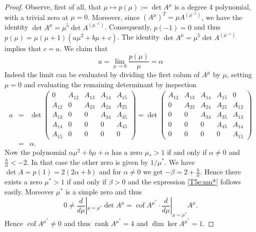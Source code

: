 \documentclass[titlepage]{amsart}
\numberwithin{equation}{section}
\theoremstyle{plain}
\theoremstyle{definition}
\theoremstyle{remark}
\newcommand{\cof}{\operatorname{cof}}
\newcommand{\rank}{\operatorname{rank}}
\begin{document}
\begin{proof}
Observe, first of all, that $\mu\mapsto p(\mu):=\det A^{\mu}$ is a degree 4 polynomial, with a trivial zero at $\mu=0$. Moreover, since $(A^\mu)^T=\mu A^{(\mu^{-1})}$, we have the identity $\det A^\mu=\mu^5\det A^{(\mu^{-1})}$. Consequently, $p(-1) = 0$ and thus
$p(\mu) = \mu (\mu+1) (a \mu^2 + b \mu + c)$. The identity $\det A^\mu=\mu^5\det A^{(\mu^{-1})}$ implies that $c=a$.
We claim that 
$$ a = \lim_{\mu \to 0} \frac{p(\mu)}{\mu} = \alpha$$
Indeed the limit can be evaluated by dividing the first colum of $A^\mu$ by $\mu$, setting $\mu = 0$ and evaluating the remaining determinant by 
inspection
\begin{eqnarray*}
a &=& \det\begin{pmatrix} 0& A_{12}& A_{13}& A_{14}& A_{15}\\ A_{12}&0& A_{23}& A_{24}& A_{25}\\
A_{13}&0&0& A_{34}& A_{35}\\ A_{14}&0&0&0& A_{45}\\ A_{15}&0&0&0&0\end{pmatrix}=
\det\begin{pmatrix}  A_{12}& A_{13}& A_{14}& A_{15}&0\\0& A_{23}& A_{24}& A_{25}& A_{12}\\
0&0&A_{34}& A_{35}& A_{13}\\0&0&0& A_{45}& A_{14}\\0&0&0&0& A_{15}\end{pmatrix}  \\ 
&=&  \alpha.
\end{eqnarray*}
Now  the polynomial $\alpha \mu^2 + b \mu + \alpha$  has a zero $\mu_* > 1$ if and only if $\alpha \ne 0$ and $\frac{b}{\alpha} < -2$. 
In that case the other zero is given by $1/{\mu^*}$.
We have  $\det A = p(1) = 2 (2\alpha + b)$ and for $\alpha \ne 0$ we get   $-\beta = 2 + \frac{b}{\alpha}$.   
Hence there exists a zero $\mu^* >1$ if and only if $\beta > 0$ and the expression  \eqref{T5e:mu*} follows easily. 
Moreover $\mu^*$ is a simple zero and thus 
$$ 0 \ne \frac{d}{d\mu}|_{\mu= \mu^*} \det A^\mu = \cof A^{\mu^*} \cdot  \frac{d}{d\mu}|_{\mu= \mu^*} A^\mu.$$ 
Hence $\cof A^{\mu^*} \ne 0$ and
 thus $\rank A^{\mu^*}=4$ 
 and $\dim \ker A^{\mu^*} = 1$.
\end{proof}

\bigskip
\end{document}
